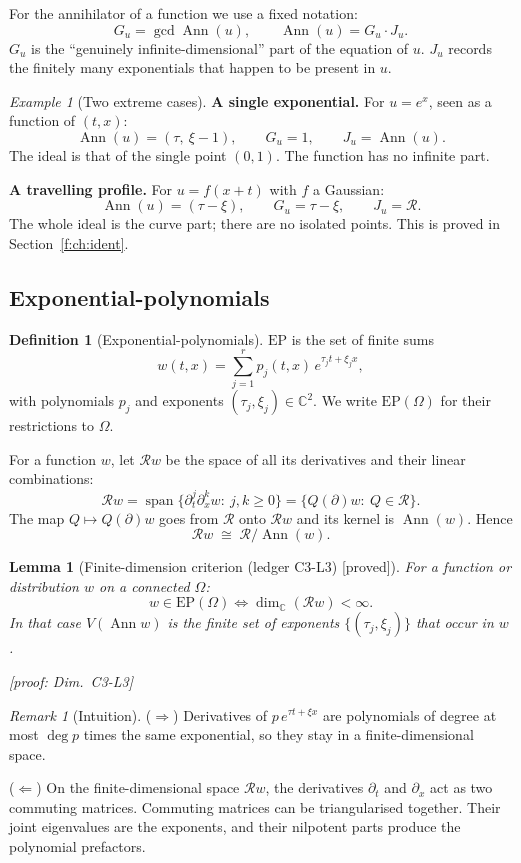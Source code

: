 \documentclass[11pt]{article}
\theoremstyle{plain}
\newtheorem{lemma}[theorem]{Lemma}
\theoremstyle{definition}
\newtheorem{definition}[theorem]{Definition}
\theoremstyle{remark}
\newtheorem{remark}[theorem]{Remark}
\newtheorem{example}[theorem]{Example}
\newcommand{\C}{\mathbb{C}}
\newcommand{\ring}{\mathcal{R}}            %
\DeclareMathOperator{\Ann}{Ann}             %
\DeclareMathOperator{\spn}{span}
\newcommand{\Var}{V}                        %
\newcommand{\EP}{\mathrm{EP}}               %
\DeclareMathOperator{\Gcd}{gcd}
\DeclareMathOperator{\dimc}{dim}
\newcommand{\badge}[2]{\textcolor{#1}{\textsf{\footnotesize[#2]}}}
\newcommand{\proved}[1][]{\badge{cC}{proved#1}}
\newcommand{\led}[1]{\textcolor{cG}{\textsf{\footnotesize(ledger #1)}}}
\newenvironment{intuition}{\begin{remark}[Intuition]}{\end{remark}}
\newcommand{\dimref}[1]{\textsf{\footnotesize[proof: Dim.~#1]}}
\begin{document}
For the annihilator of a function we use a fixed notation:
\[
G_u=\Gcd\Ann(u),\qquad \Ann(u)=G_u\cdot J_u .
\]
$G_u$ is the ``genuinely infinite-dimensional'' part of the equation of $u$. $J_u$ records the finitely many exponentials that happen to be present in $u$.

\begin{example}[{Two extreme cases}]
\textbf{A single exponential.} For $u=e^{x}$, seen as a function of $(t,x)$:
\[
\Ann(u)=(\tau,\ \xi-1),\qquad G_u=1,\qquad J_u=\Ann(u).
\]
The ideal is that of the single point $(0,1)$. The function has no infinite part.

\textbf{A travelling profile.} For $u=f(x+t)$ with $f$ a Gaussian:
\[
\Ann(u)=(\tau-\xi),\qquad G_u=\tau-\xi,\qquad J_u=\ring .
\]
The whole ideal is the curve part; there are no isolated points. This is proved in Section~\ref{f:ch:ident}.
\end{example}

\subsection{Exponential-polynomials}

\begin{definition}[{Exponential-polynomials}]\label{f:def:ep}
$\EP$ is the set of finite sums
\[
w(t,x)=\sum_{j=1}^{r}p_j(t,x)\,e^{\tau_jt+\xi_jx},
\]
with polynomials $p_j$ and exponents $(\tau_j,\xi_j)\in\C^2$. We write $\EP(\Omega)$ for their restrictions to $\Omega$.
\end{definition}

For a function $w$, let $\ring w$ be the space of all its derivatives and their linear combinations:
\[
\ring w=\spn\{\partial_t^j\partial_x^k w:\ j,k\ge0\}=\{Q(\partial)w:\ Q\in\ring\}.
\]
The map $Q\mapsto Q(\partial)w$ goes from $\ring$ onto $\ring w$ and its kernel is $\Ann(w)$. Hence
\[
\ring w\;\cong\;\ring/\Ann(w).
\]

\begin{lemma}[{Finite-dimension criterion \led{C3-L3} \proved}]\label{f:lem:ep}
For a function or distribution $w$ on a connected $\Omega$:
\[
w\in\EP(\Omega)\iff\dimc_\C(\ring w)<\infty .
\]
In that case $\Var(\Ann w)$ is the finite set of exponents $\{(\tau_j,\xi_j)\}$ that occur in $w$.

\dimref{C3-L3}
\end{lemma}

\begin{intuition}
($\Rightarrow$) Derivatives of $p\,e^{\tau t+\xi x}$ are polynomials of degree at most $\deg p$ times the same exponential, so they stay in a finite-dimensional space.

($\Leftarrow$) On the finite-dimensional space $\ring w$, the derivatives $\partial_t$ and $\partial_x$ act as two commuting matrices. Commuting matrices can be triangularised together. Their joint eigenvalues are the exponents, and their nilpotent parts produce the polynomial prefactors.
\end{intuition}
\end{document}
